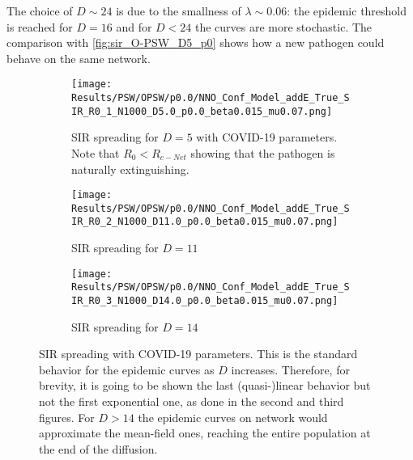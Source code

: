 \documentclass[a4paper,10pt,twoside]{book} %
\theoremstyle{definition}
\begin{document}
The choice of $D \sim 24$ is due to the smallness of $\lambda \sim 0.06$: the epidemic threshold is reached for $D = 16$ and for $D < 24$ the curves are more stochastic. The comparison with \autoref{fig:sir_O-PSW_D5_p0} shows how a new pathogen could behave on the same network.
\begin{figure}[p]
	\centering
    \begin{subfigure}[t]{\linewidth}
        \texttt{[image: Results/PSW/OPSW/p0.0/NNO\_Conf\_Model\_addE\_True\_SIR\_R0\_1\_N1000\_D5.0\_p0.0\_beta0.015\_mu0.07.png]}
		\centering
        \caption{SIR spreading for $D = 5$ with COVID-19 parameters. Note that $R_0 < R_{c-Net}$ showing that the pathogen is naturally extinguishing.}
        \label{fig:sir_O-PSW_D5_p0}
    \end{subfigure}
	\vfill
	\begin{subfigure}[b]{\linewidth}
		\centering
        \texttt{[image: Results/PSW/OPSW/p0.0/NNO\_Conf\_Model\_addE\_True\_SIR\_R0\_2\_N1000\_D11.0\_p0.0\_beta0.015\_mu0.07.png]}
        \caption{SIR spreading for $D = 11$}
        \label{fig:sir_O-PSW_D11_p0}
    \end{subfigure}
	\vfill
	\begin{subfigure}[b]{\linewidth}
		\centering
        \texttt{[image: Results/PSW/OPSW/p0.0/NNO\_Conf\_Model\_addE\_True\_SIR\_R0\_3\_N1000\_D14.0\_p0.0\_beta0.015\_mu0.07.png]}
        \caption{SIR spreading for $D = 14$}
        \label{fig:sir_O-PSW_D14_p0}
    \end{subfigure}
	\caption{SIR spreading with COVID-19 parameters. This is the standard behavior for the epidemic curves as $D$ increases. Therefore, for brevity, it is going to be shown the last (quasi-)linear behavior but not the first exponential one, as done in the second and third figures.
	For $D > 14$ the epidemic curves on network would approximate the mean-field ones, reaching the entire population at the end of the diffusion.}
	\label{fig:sir_O-PSW_COVID}
\end{figure}
\end{document}
